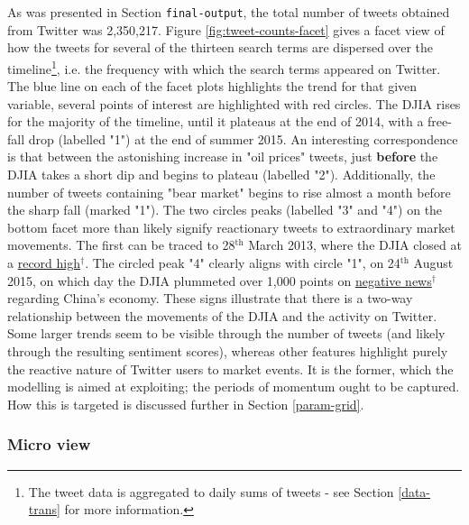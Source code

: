 \documentclass{article}
\begin{document}
As was presented in Section \texttt{final-output}, the total number of tweets obtained from Twitter was 2,350,217. Figure \ref{fig:tweet-counts-facet} gives a facet view of how the tweets for several of the thirteen search terms are dispersed over the timeline\footnote{The tweet data is aggregated to daily sums of tweets - see Section \ref{data-trans} for more information.}, i.e. \hspace{-12pt} the frequency with which the search terms appeared on Twitter. The blue line on each of the facet plots highlights the trend for that given variable, several points of interest are highlighted with red circles. The DJIA rises for the majority of the timeline, until it plateaus at the end of 2014, with a free-fall drop (labelled "1") at the end of summer 2015. An interesting correspondence is that between the astonishing increase in "oil prices" tweets, just \textbf{before} the DJIA takes a short dip and begins to plateau (labelled "2"). Additionally, the number of tweets containing "bear market" begins to rise almost a month before the sharp fall (marked "1").
The two circles peaks (labelled "3" and "4") on the bottom facet more than likely signify reactionary tweets to extraordinary market movements. The first can be traced to 28$^{\text{th}}$ March 2013, where the DJIA closed at a \href{http://www.ibtimes.com/sp-500-dow-jones-industrial-average-stock-indexes-close-record-high-markets-recovery-1153105}{record high$^{\dag{}}$}. The circled peak "4" clearly aligns with circle "1", on 24$^{\text{th}}$ August 2015, on which day the DJIA plummeted over 1,000 points on \href{http://www.ibtimes.com/dow-jones-industrial-average-plummets-global-stocks-take-black-monday-plunge-great-2065359}{negative news$^{\dag{}}$} regarding China's economy. These signs illustrate that there is a two-way relationship between the movements of the DJIA and the activity on Twitter. Some larger trends seem to be visible through the number of tweets (and likely through the resulting sentiment scores), whereas other features highlight purely the reactive nature of Twitter users to market events. It is the former, which the modelling is aimed at exploiting; the periods of momentum ought to be captured. How this is targeted is discussed further in Section \ref{param-grid}.


\subsubsection{Micro view \label{micro-view}}
\label{sec-1-3-2}
\end{document}
